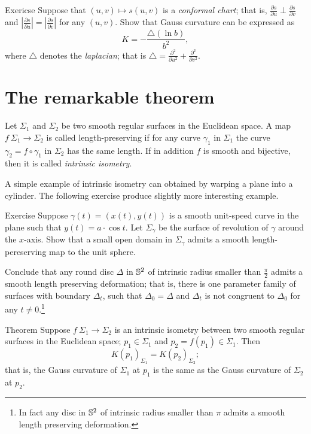 \begin{thm}{Exericse}
Suppose that $(u,v)\mapsto s(u,v)$ is a \emph{conformal chart};
that is, $\tfrac{\partial s}{\partial u}\perp\tfrac{\partial s}{\partial v}$ and $|\tfrac{\partial s}{\partial u}|=|\tfrac{\partial s}{\partial v}|$ for any $(u,v)$.
Show that Gauss curvature can be expressed as 
\[K=-\frac{\triangle (\ln b)}{b^2},\]
where $\triangle$ denotes the \emph{laplacian}; that is $\triangle=\tfrac{\partial^2}{\partial u^2}+\tfrac{\partial^2}{\partial v^2}$.
\end{thm}


\section*{The remarkable theorem}

Let $\Sigma_1$ and $\Sigma_2$ be two smooth regular surfaces in the Euclidean space.
A map $f\:\Sigma_1\to \Sigma_2$ is called  length-preserving if for any curve $\gamma_1$ in $\Sigma_1$ the curve $\gamma_2=f\circ\gamma_1$ in $\Sigma_2$ has the same length. %
If in addition $f$ is smooth and bijective, then it is called \emph{intrinsic isometry}. 

A simple example of intrinsic isometry can obtained by warping a plane into a cylinder.
The following exercise produce slightly more interesting example.

\begin{thm}{Exercise}\label{ex:deformation}
Suppose $\gamma(t)=(x(t),y(t))$ is a smooth unit-speed curve in the plane such that $y(t)=a\cdot \cos t$.
Let $\Sigma_\gamma$ be the surface of revolution of $\gamma$ around the $x$-axis.
Show that a small open domain in $\Sigma_\gamma$ admits a smooth length-pereserving map to the unit sphere.

Conclude that any round disc $\Delta$ in $\mathbb{S}^2$ of intrinsic radius smaller than $\tfrac\pi2$ admits a smooth length preserving deformation; that is, there is one parameter family of surfaces with boundary $\Delta_t$, such that $\Delta_0=\Delta$ and $\Delta_t$ is not congruent to $\Delta_0$ for any $t\ne0$.\footnote{In fact any disc in $\mathbb{S}^2$ of intrinsic radius smaller than $\pi$ admits a smooth length preserving deformation. %
}
\end{thm}


\begin{thm}{Theorem}\label{thm:remarkable}
Suppose $f\:\Sigma_1\to \Sigma_2$ is an intrinsic isometry between two smooth regular surfaces in  the Euclidean space; $p_1\in \Sigma_1$ and $p_2=f(p_1)\in \Sigma_1$.
Then 
\[K(p_1)_{\Sigma_1}=K(p_2)_{\Sigma_2};\]
that is, the Gauss curvature of $\Sigma_1$ at $p_1$ is the same as the Gauss curvature of $\Sigma_2$ at $p_2$.
\end{thm}

